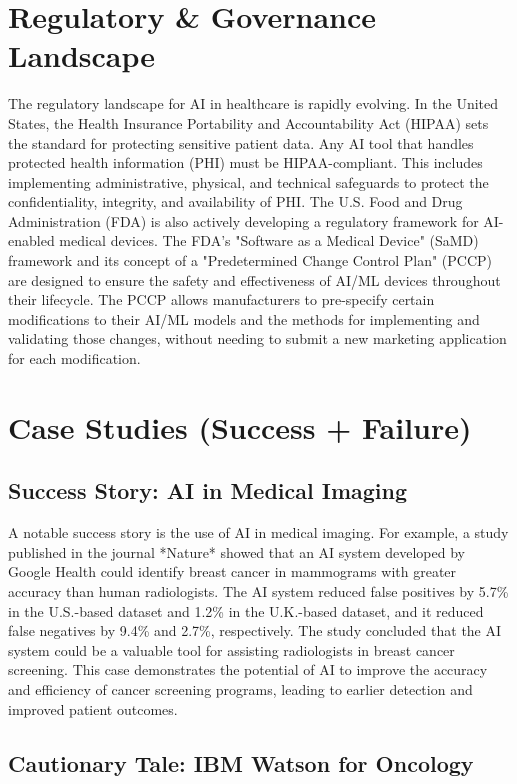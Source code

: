 \section{Regulatory \& Governance Landscape}

The regulatory landscape for AI in healthcare is rapidly evolving. In the United States, the Health Insurance Portability and Accountability Act (HIPAA) sets the standard for protecting sensitive patient data. Any AI tool that handles protected health information (PHI) must be HIPAA-compliant. This includes implementing administrative, physical, and technical safeguards to protect the confidentiality, integrity, and availability of PHI. The U.S. Food and Drug Administration (FDA) is also actively developing a regulatory framework for AI-enabled medical devices. The FDA's "Software as a Medical Device" (SaMD) framework and its concept of a "Predetermined Change Control Plan" (PCCP) are designed to ensure the safety and effectiveness of AI/ML devices throughout their lifecycle. The PCCP allows manufacturers to pre-specify certain modifications to their AI/ML models and the methods for implementing and validating those changes, without needing to submit a new marketing application for each modification.

\section{Case Studies (Success + Failure)}

\subsection{Success Story: AI in Medical Imaging}

A notable success story is the use of AI in medical imaging. For example, a study published in the journal *Nature* showed that an AI system developed by Google Health could identify breast cancer in mammograms with greater accuracy than human radiologists. The AI system reduced false positives by 5.7\% in the U.S.-based dataset and 1.2\% in the U.K.-based dataset, and it reduced false negatives by 9.4\% and 2.7\%, respectively. The study concluded that the AI system could be a valuable tool for assisting radiologists in breast cancer screening. This case demonstrates the potential of AI to improve the accuracy and efficiency of cancer screening programs, leading to earlier detection and improved patient outcomes.

\subsection{Cautionary Tale: IBM Watson for Oncology}

